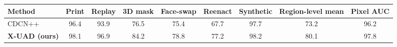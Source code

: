 \begin{tabular}{lcccccccc}
\toprule
Method & Print & Replay & 3D mask & Face-swap & Reenact & Synthetic & Region-level mean & Pixel AUC \\
\midrule
CDCN++~\cite{yu2020cdcn} & 96.4 & 93.9 & 76.5 & 75.4 & 67.7 & 97.7 & 73.2 & 96.2 \\
\textbf{X-UAD (ours)} & 98.1 & 96.9 & 84.2 & 78.8 & 77.2 & 98.2 & 80.1 & 97.8 \\
\bottomrule
\end{tabular}